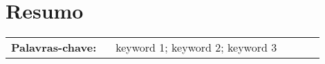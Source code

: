 
\section*{Resumo}


\lipsum[2]


\vfill

\begin{tabular}{p{0.3\linewidth} p{0.6\linewidth}}
\textbf{\Large Palavras-chave:} & keyword 1; keyword  2; keyword 3  
\end{tabular}  \\
